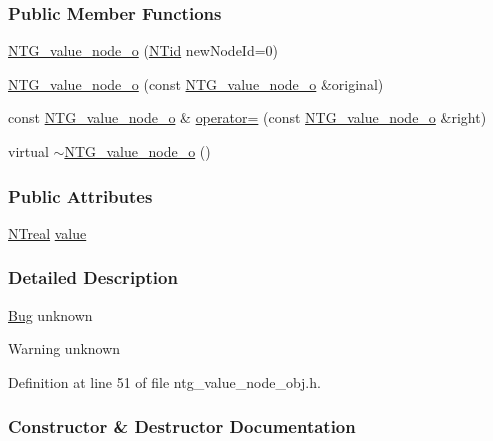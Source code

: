 \subsubsection*{Public Member Functions}
\begin{DoxyCompactItemize}
\item 
\hyperlink{class_n_t_g__value__node__o_ac24ab98f010e85b169526b1bb11d4f8d}{NTG\_\-value\_\-node\_\-o} (\hyperlink{nt__types_8h_ab5cab5f78fdd2211c340cbe527a4afd7}{NTid} newNodeId=0)
\item 
\hyperlink{class_n_t_g__value__node__o_a9c3f426d6a8c259172dc4abf04bd3bf1}{NTG\_\-value\_\-node\_\-o} (const \hyperlink{class_n_t_g__value__node__o}{NTG\_\-value\_\-node\_\-o} \&original)
\item 
const \hyperlink{class_n_t_g__value__node__o}{NTG\_\-value\_\-node\_\-o} \& \hyperlink{class_n_t_g__value__node__o_a35c446777e1e40401c6c30c913746978}{operator=} (const \hyperlink{class_n_t_g__value__node__o}{NTG\_\-value\_\-node\_\-o} \&right)
\item 
virtual \hyperlink{class_n_t_g__value__node__o_a44dac53e25e4b4edcdf4da4f98507ee2}{$\sim$NTG\_\-value\_\-node\_\-o} ()
\end{DoxyCompactItemize}
\subsubsection*{Public Attributes}
\begin{DoxyCompactItemize}
\item 
\hyperlink{nt__types_8h_a814a97893e9deb1eedcc7604529ba80d}{NTreal} \hyperlink{class_n_t_g__value__node__o_a6640fa408ce8f8f1f5dc7ad28d6f63d4}{value}
\end{DoxyCompactItemize}


\subsubsection{Detailed Description}
\begin{Desc}
\item[\hyperlink{bug__bug000092}{Bug}]unknown \end{Desc}
\begin{DoxyWarning}{Warning}
unknown 
\end{DoxyWarning}


Definition at line 51 of file ntg\_\-value\_\-node\_\-obj.h.



\subsubsection{Constructor \& Destructor Documentation}
